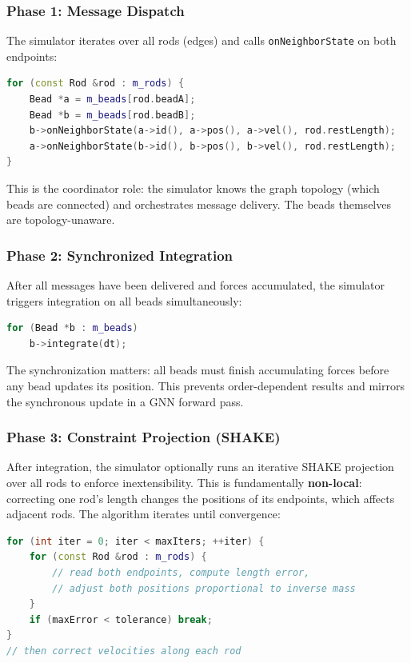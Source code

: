 \documentclass[11pt,a4paper]{article}
\begin{document}
\subsubsection{Phase 1: Message Dispatch}

The simulator iterates over all rods (edges) and calls
\texttt{onNeighborState} on both endpoints:

\begin{lstlisting}[language=C++,caption={Message dispatch in ChainSimulator::step()}]
for (const Rod &rod : m_rods) {
    Bead *a = m_beads[rod.beadA];
    Bead *b = m_beads[rod.beadB];
    b->onNeighborState(a->id(), a->pos(), a->vel(), rod.restLength);
    a->onNeighborState(b->id(), b->pos(), b->vel(), rod.restLength);
}
\end{lstlisting}

This is the coordinator role: the simulator knows the graph topology (which
beads are connected) and orchestrates message delivery. The beads themselves
are topology-unaware.

\subsubsection{Phase 2: Synchronized Integration}

After all messages have been delivered and forces accumulated, the simulator
triggers integration on all beads simultaneously:

\begin{lstlisting}[language=C++]
for (Bead *b : m_beads)
    b->integrate(dt);
\end{lstlisting}

The synchronization matters: all beads must finish accumulating forces before
any bead updates its position. This prevents order-dependent results and
mirrors the synchronous update in a GNN forward pass.

\subsubsection{Phase 3: Constraint Projection (SHAKE)}
\label{sec:qt_shake}

After integration, the simulator optionally runs an iterative SHAKE projection
over all rods to enforce inextensibility. This is fundamentally
\textbf{non-local}: correcting one rod's length changes the positions of its
endpoints, which affects adjacent rods. The algorithm iterates until
convergence:

\begin{lstlisting}[language=C++,caption={SHAKE constraint projection (simplified)}]
for (int iter = 0; iter < maxIters; ++iter) {
    for (const Rod &rod : m_rods) {
        // read both endpoints, compute length error,
        // adjust both positions proportional to inverse mass
    }
    if (maxError < tolerance) break;
}
// then correct velocities along each rod
\end{lstlisting}
\end{document}
